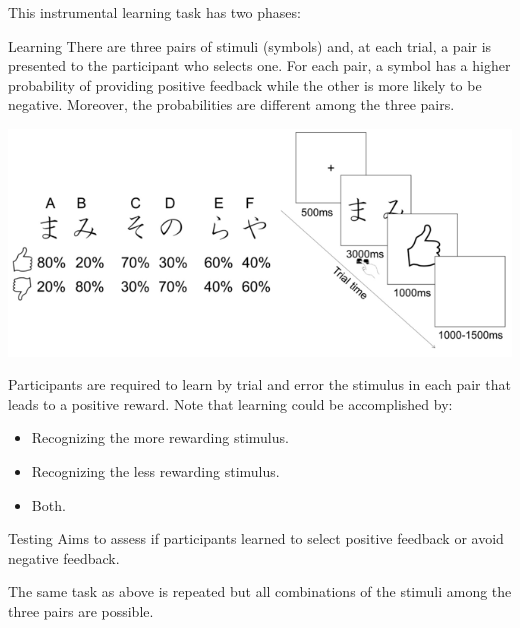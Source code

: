 \begin{description}
        \begin{@empty}
            \small
            \begin{example}
                This instrumental learning task has two phases:
                \begin{descriptionlist}
                    \item[Learning]
                        There are three pairs of stimuli (symbols) and, at each trial, a pair is presented to the participant who selects one.
                        For each pair, a symbol has a higher probability of providing positive feedback while the other is more likely to be negative.
                        Moreover, the probabilities are different among the three pairs.

                        \begin{center}
                            \includegraphics[width=0.55\linewidth]{./img/instrumental_dopamine_selection1.png}
                        \end{center}

                        Participants are required to learn by trial and error the stimulus in each pair that leads to a positive reward.
                        Note that learning could be accomplished by:
                        \begin{itemize}
                            \item Recognizing the more rewarding stimulus.
                            \item Recognizing the less rewarding stimulus.
                            \item Both.
                        \end{itemize}

                    \item[Testing]
                        Aims to assess if participants learned to select positive feedback or avoid negative feedback.

                        The same task as above is repeated but all combinations of the stimuli among the three pairs are possible.
                \end{descriptionlist}


\end{example}
\end{@empty}
\end{description}

